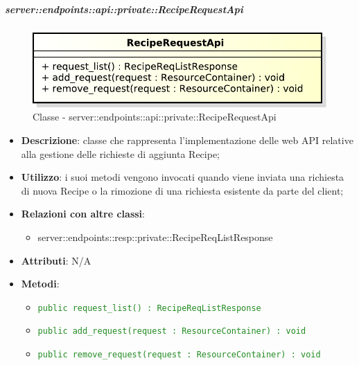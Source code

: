     \subparagraph{server::endpoints::api::private::RecipeRequestApi} %
    \label{subp:bdsm_app_server_endpoints_api_private::reciperequestapi}
	\begin{figure}[!htbp]
		\centering
		\centerline{\includegraphics[scale=0.6]{./images/server/classes/endpoints/recipe_request_api.pdf}}
		\caption{Classe - server::endpoints::api::private::RecipeRequestApi}
	\end{figure}
    \begin{itemize}
      \item \textbf{Descrizione}: classe che rappresenta l'implementazione delle web API relative alla gestione delle richieste di aggiunta Recipe;
      \item \textbf{Utilizzo}: i suoi metodi vengono invocati quando viene inviata una richiesta di nuova Recipe o la rimozione di una richiesta esistente da parte del client;
      \item \textbf{Relazioni con altre classi}:
        \begin{itemize}
          \item server::endpoints::resp::private::RecipeReqListResponse
        \end{itemize}
		\item \textbf{Attributi}: N/A
		\item \textbf{Metodi}:
			\begin{itemize}
				\item \textcolor{forestgreen}{\texttt{public request\_list() : RecipeReqListResponse}}
				\item \textcolor{forestgreen}{\texttt{public add\_request(request : ResourceContainer) : void}}
				\item \textcolor{forestgreen}{\texttt{public remove\_request(request : ResourceContainer) : void}}
     	 \end{itemize}
      \end{itemize}

